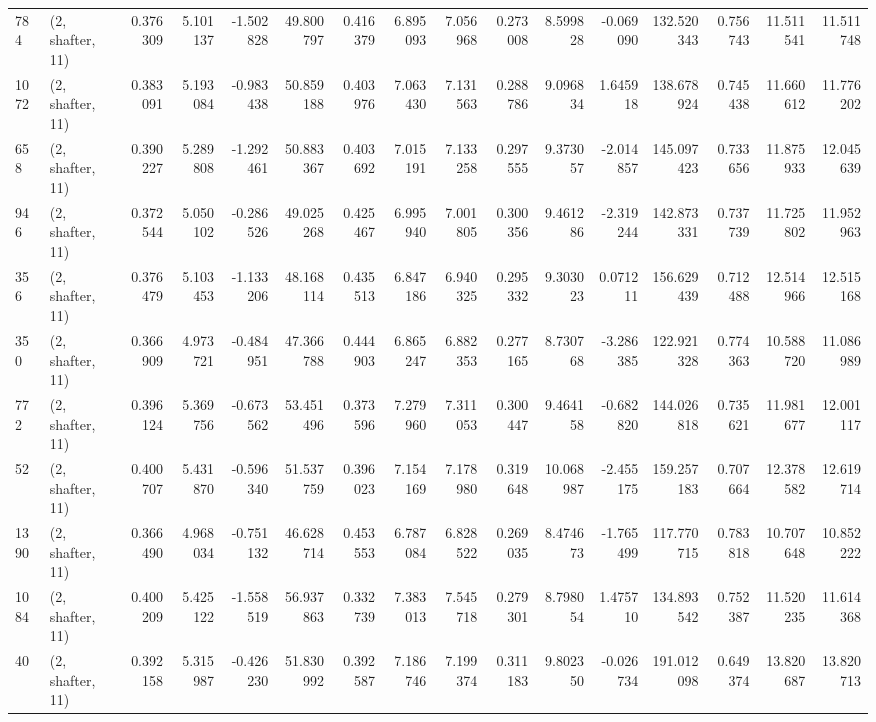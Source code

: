 \begin{tabular}{llrrrrrrrrrrrrrr}
784  &  (2, shafter, 11) &   0.376309 &   5.101137 &  -1.502828 &     49.800797 &    0.416379 &    6.895093 &    7.056968 &  0.273008 &   8.599828 &  -0.069090 &   132.520343 &   0.756743 &  11.511541 &  11.511748 \\
1072 &  (2, shafter, 11) &   0.383091 &   5.193084 &  -0.983438 &     50.859188 &    0.403976 &    7.063430 &    7.131563 &  0.288786 &   9.096834 &   1.645918 &   138.678924 &   0.745438 &  11.660612 &  11.776202 \\
658  &  (2, shafter, 11) &   0.390227 &   5.289808 &  -1.292461 &     50.883367 &    0.403692 &    7.015191 &    7.133258 &  0.297555 &   9.373057 &  -2.014857 &   145.097423 &   0.733656 &  11.875933 &  12.045639 \\
946  &  (2, shafter, 11) &   0.372544 &   5.050102 &  -0.286526 &     49.025268 &    0.425467 &    6.995940 &    7.001805 &  0.300356 &   9.461286 &  -2.319244 &   142.873331 &   0.737739 &  11.725802 &  11.952963 \\
356  &  (2, shafter, 11) &   0.376479 &   5.103453 &  -1.133206 &     48.168114 &    0.435513 &    6.847186 &    6.940325 &  0.295332 &   9.303023 &   0.071211 &   156.629439 &   0.712488 &  12.514966 &  12.515168 \\
350  &  (2, shafter, 11) &   0.366909 &   4.973721 &  -0.484951 &     47.366788 &    0.444903 &    6.865247 &    6.882353 &  0.277165 &   8.730768 &  -3.286385 &   122.921328 &   0.774363 &  10.588720 &  11.086989 \\
772  &  (2, shafter, 11) &   0.396124 &   5.369756 &  -0.673562 &     53.451496 &    0.373596 &    7.279960 &    7.311053 &  0.300447 &   9.464158 &  -0.682820 &   144.026818 &   0.735621 &  11.981677 &  12.001117 \\
52   &  (2, shafter, 11) &   0.400707 &   5.431870 &  -0.596340 &     51.537759 &    0.396023 &    7.154169 &    7.178980 &  0.319648 &  10.068987 &  -2.455175 &   159.257183 &   0.707664 &  12.378582 &  12.619714 \\
1390 &  (2, shafter, 11) &   0.366490 &   4.968034 &  -0.751132 &     46.628714 &    0.453553 &    6.787084 &    6.828522 &  0.269035 &   8.474673 &  -1.765499 &   117.770715 &   0.783818 &  10.707648 &  10.852222 \\
1084 &  (2, shafter, 11) &   0.400209 &   5.425122 &  -1.558519 &     56.937863 &    0.332739 &    7.383013 &    7.545718 &  0.279301 &   8.798054 &   1.475710 &   134.893542 &   0.752387 &  11.520235 &  11.614368 \\
40   &  (2, shafter, 11) &   0.392158 &   5.315987 &  -0.426230 &     51.830992 &    0.392587 &    7.186746 &    7.199374 &  0.311183 &   9.802350 &  -0.026734 &   191.012098 &   0.649374 &  13.820687 &  13.820713 \\

\end{tabular}
